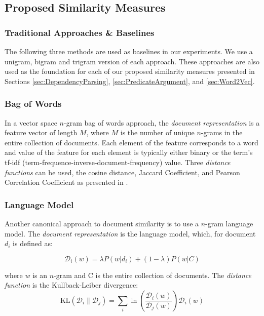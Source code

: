 \documentclass[11pt]{article}
\begin{document}
\subsection{Proposed Similarity Measures}

\subsubsection{Traditional Approaches \& Baselines} \label{sec:TraditionalApproaches}

The following  three methods are used as baselines in our experiments. We use a unigram, bigram and trigram version of each approach. These approaches are also used as the foundation for each of our proposed similarity measures presented in Sections \ref{sec:DependencyParsing}, \ref{sec:PredicateArgument}, and \ref{sec:Word2Vec}.

\subsubsection*{Bag of Words}

In a vector space $n$-gram bag of words approach, the \emph{document representation} is a feature vector of length $M$, where $M$ is the number of unique $n$-grams in the entire collection of documents. Each element of the feature corresponds to a word and value of the feature for each element is typically either binary or the term's tf-idf (term-frequence-inverse-document-frequency) value. Three \emph{distance functions} can be used, the cosine distance, Jaccard Coefficient, and Pearson Correlation Coefficient as presented in \cite{Huang2008}.  

\subsubsection*{Language Model}

Another canonical approach to document similarity is to use a $n$-gram language model.  The \emph{document representation} is the language model, which, for document $d_i$ is defined as:

\begin{equation}
\mathcal{D}_i(w) = \lambda P(w|d_i) + (1 - \lambda) P(w| C)
\end{equation}

where $w$ is an $n$-gram and C is the entire collection of documents. The \emph{distance function} is the Kullback-Leiber divergence: 
\begin{equation}
{\mathrm{KL}}(\mathcal{D}_i\|\mathcal{D}_j) = \sum_i \ln\left(\frac{\mathcal{D}_i(w)}{\mathcal{D}_j(w)}\right) \mathcal{D}_i(w)
\end{equation}
\end{document}
